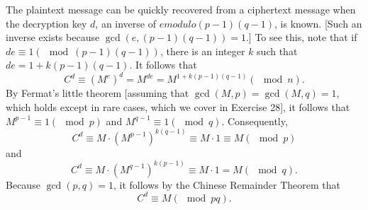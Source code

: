 The plaintext message can be quickly recovered from a ciphertext message when the decryption
key $d$, an inverse of $e modulo (p-1)(q-1)$, is known. [Such an inverse exists because
$\gcd(e, (p-1)(q-1)) = 1$.] To see this, note that if $de \equiv 1 (\mod (p-1)(q-1))$, there is an
integer $k$ such that $de = 1 + k(p-1)(q-1)$. It follows that
$$C^d \equiv (M^e)^d = M^{de} = M^{1+k(p-1)(q-1)} (\mod n).$$
By Fermat’s little theorem [assuming that $\gcd(M, p) = \gcd(M, q) = 1$, which holds except in
rare cases, which we cover in Exercise 28], it follows that $M^{p-1} \equiv 1 (\mod p)$ and $M^{q-1} \equiv
1 (\mod q)$. Consequently,
$$C^d \equiv M \cdot (M^{p-1})^{k(q-1)} \equiv M \cdot 1 \equiv M (\mod p)$$
and
$$C^d \equiv M \cdot (M^{q-1})^{k(p-1)} \equiv M \cdot 1 = M (\mod q).$$
Because $\gcd(p, q) = 1$, it follows by the Chinese Remainder Theorem that
$$C^d \equiv M (\mod pq).$$
\newpage

